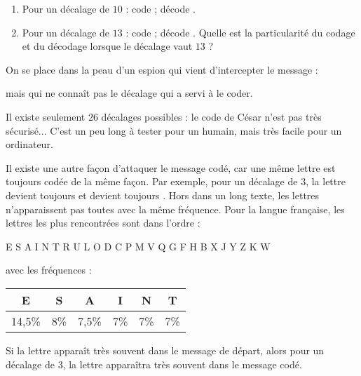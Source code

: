 \documentclass[class=report,crop=false, 12pt]{standalone}
\begin{document}
\begin{activite}
\begin{enumerate}
  \begin{enumerate}
    \item Pour un décalage de $10$ : code  ; décode .
    \item Pour un décalage de $13$ : code  ; décode .
    Quelle est la particularité du codage et du décodage lorsque le décalage vaut $13$ ?
  \end{enumerate}  
 
  
\end{enumerate}

\end{activite}



\begin{activite}
On se place dans la peau d'un espion qui vient d'intercepter le message : 

\centerline{}
mais qui ne connaît pas le décalage qui a servi à le coder.

Il existe seulement $26$ décalages possibles : le code de César n'est pas très sécurisé... C'est un peu long à tester pour un humain, mais très facile pour un ordinateur.

Il existe une autre façon d'attaquer le message codé, car une même lettre est toujours codée de la même façon. Par exemple, pour un décalage de $3$, la lettre  devient toujours  et  devient toujours . Hors dans un long texte, les lettres n'apparaissent pas toutes avec la même fréquence.
Pour la langue française, les lettres les plus rencontrées sont dans l'ordre : \\
\centerline{E S A I N T R U L O D C P M V Q G F H B X J Y Z K W}
avec les fréquences :
\begin{center}
\begin{tabular}{|c|c|c|c|c|c|}
\hline
{E}&{S}&{A}&{I}&{N}&{T}\\
\hline
14,5\%&8\%&7,5\%&7\%&7\%&7\%\\
\hline
\end{tabular}
\end{center}

Si la lettre  apparaît très souvent dans le message de départ, alors pour un décalage de $3$, la lettre  apparaîtra très souvent dans le message codé.


\end{activite}
\end{document}

